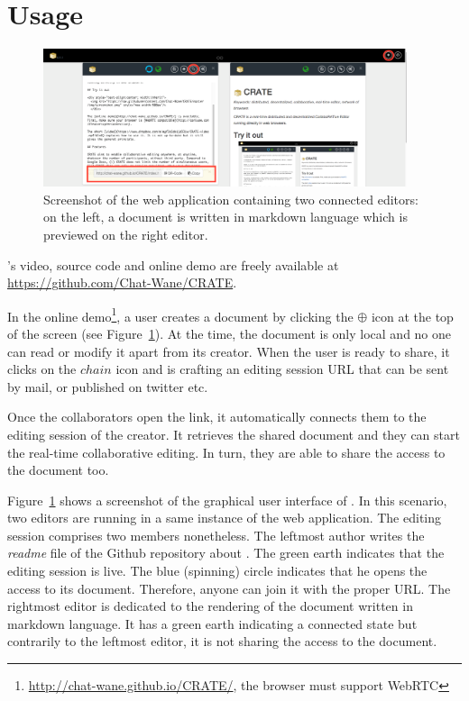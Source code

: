 
\section{Usage}
\label{sec:usage}

\begin{figure}
  \centering
  \includegraphics[width=0.95\textwidth]{./img/crate.png}
  \caption{\label{img:screenshot} Screenshot of the web application containing
    two connected editors: on the left, a document is written in markdown
    language which is previewed on the right editor.}
\end{figure}

\CRATE's video, source code and online demo are freely available at
\url{https://github.com/Chat-Wane/CRATE}.


In the online demo\footnote{\url{http://chat-wane.github.io/CRATE/}, the browser
  must support WebRTC}, a user creates a document by clicking the $\oplus$ icon
at the top of the screen (see Figure~\ref{img:screenshot}). At the time, the
document is only local and no one can read or modify it apart from its
creator. When the user is ready to share, it clicks on the $chain$ icon and
\CRATE is crafting an editing session URL that can be sent by mail, or published
on twitter etc.

Once the collaborators open the link, it automatically connects them
to the editing session of the creator. It retrieves the shared
document and they can start the real-time collaborative editing. In
turn, they are able to share the access to the document too. 

Figure~\ref{img:screenshot} shows a screenshot of the graphical user interface
of \CRATE. In this scenario, two editors are running in a same instance of the
web application. The editing session comprises two members nonetheless. The
leftmost author writes the \emph{readme} file of the Github repository about
\CRATE. The green earth indicates that the editing session is live. The blue
(spinning) circle indicates that he opens the access to its document. Therefore,
anyone can join it with the proper URL. The rightmost editor is dedicated to the
rendering of the document written in markdown language. It has a green earth
indicating a connected state but contrarily to the leftmost editor, it is not
sharing the access to the document.

